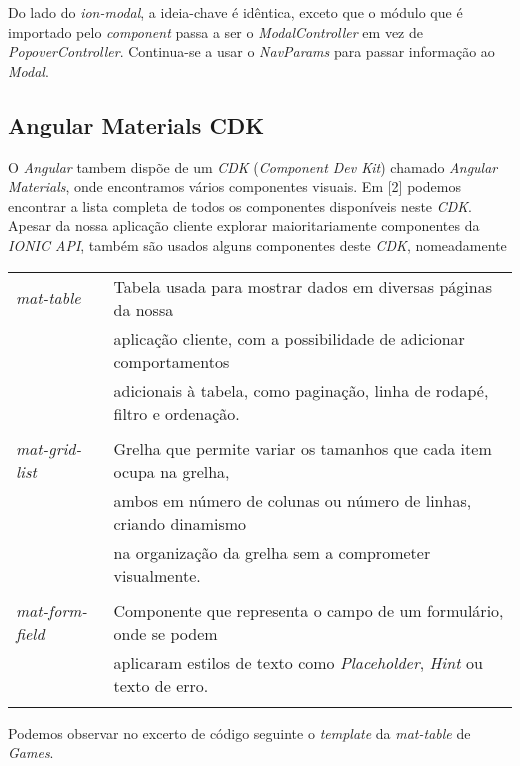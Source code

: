 Do lado do \textit{ion-modal}, a ideia-chave é idêntica, exceto que o módulo que é importado pelo \textit{component} passa a ser o \textit{ModalController} em vez de \textit{PopoverController}. Continua-se a usar o \textit{NavParams} para passar informação ao \textit{Modal}.

\subsection{Angular Materials CDK}

O \textit{Angular} tambem dispõe de um \textit{CDK} (\textit{Component Dev Kit}) chamado \textit{Angular Materials}, onde encontramos vários componentes visuais. Em [2] podemos encontrar a lista completa de todos os componentes disponíveis neste \textit{CDK}. Apesar da nossa aplicação cliente explorar maioritariamente componentes da \textit{IONIC API}, também são usados alguns componentes deste \textit{CDK}, nomeadamente\\

\begin{tabular}{ll}
	\textit{mat-table} & Tabela usada para mostrar dados em diversas páginas da nossa \\
	&aplicação cliente, com a possibilidade de 
	adicionar comportamentos \\
	&adicionais à tabela, como paginação, linha de rodapé, filtro e ordenação. \\
	& \\
	\textit{mat-grid-list} & Grelha que permite variar os tamanhos que cada item ocupa na grelha,\\
	& ambos em número de colunas ou número de linhas, criando dinamismo \\
	&na organização da grelha sem a comprometer visualmente.\\
	& \\
	\textit{mat-form-field} & Componente que representa o campo de um formulário, onde se podem \\
	&aplicaram estilos de texto como \textit{Placeholder}, \textit{Hint} ou texto de erro. \\
	\\
\end{tabular}

Podemos observar no excerto de código seguinte o \textit{template} da \textit{mat-table} de \textit{Games}.

